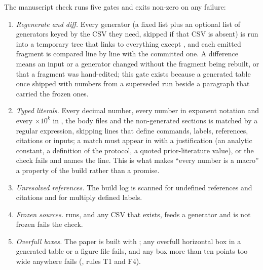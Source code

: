 The manuscript check runs five gates and exits non-zero on any failure:
\begin{enumerate}
\item \emph{Regenerate and diff.} Every generator (a fixed list plus an optional list of
  generators keyed by the CSV they need, skipped if that CSV is absent) is run into a
  temporary tree that links to everything except , and each emitted
  fragment is compared line by line with the committed one. A difference means an input
  or a generator changed without the fragment being rebuilt, or that a fragment was
  hand-edited; this gate exists because a generated table once shipped with numbers from
  a superseded run beside a paragraph that carried the frozen ones.
\item \emph{Typed literals.} Every decimal number, every number in exponent notation and
  every $\times10^{k}$ in , the body files and the non-generated sections
  is matched by a regular expression, skipping lines that define commands, labels,
  references, citations or inputs; a match must appear in 
  with a justification (an analytic constant, a definition of the protocol, a quoted
  prior-literature value), or the check fails and names the line. This is what makes
  ``every number is a macro'' a property of the build rather than a promise.
\item \emph{Unresolved references.} The build log is scanned for undefined references
  and citations and for multiply defined labels.
\item \emph{Frozen sources.}  runs, and any CSV that exists,
  feeds a generator and is not frozen fails the check.
\item \emph{Overfull boxes.} The paper is built with ; any overfull
  horizontal box in a generated table or a figure file fails, and any box more than ten
  points too wide anywhere fails (, rules T1 and F4).
\end{enumerate}

\subsection{}

